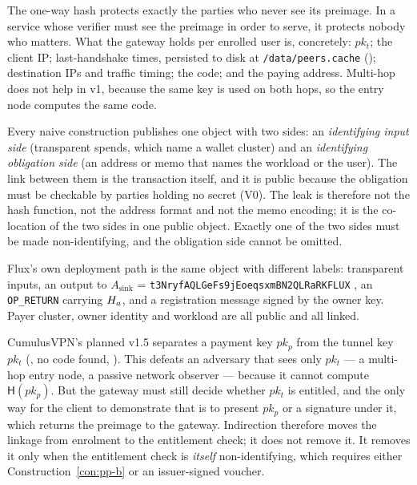 The one-way hash protects exactly the parties who never see its preimage. In a service whose verifier
must see the preimage in order to serve, it protects nobody who matters. What the gateway holds per
enrolled user is, concretely: $pk_t$; the client IP; last-handshake times, persisted to disk at
\texttt{/\allowbreak{}data/\allowbreak{}peers.\allowbreak{}cache} ();
destination IPs and traffic timing; the code; and the paying address. Multi-hop does not help in v1,
because the same key is used on both hops, so the entry node computes the same code.

\begin{property}
\label{prop:pp-general}
Every naive construction publishes one object with two sides: an \emph{identifying input side}
(transparent spends, which name a wallet cluster) and an \emph{identifying obligation side} (an
address or memo that names the workload or the user). The link between them is the transaction itself,
and it is public because the obligation must be checkable by parties holding no secret (V0). The leak
is therefore not the hash function, not the address format and not the memo encoding; it is the
co-location of the two sides in one public object. Exactly one of the two sides must be made
non-identifying, and the obligation side cannot be omitted.
\end{property}

Flux's own deployment path is the same object with different labels: transparent inputs, an output to
$A_{\mathrm{sink}}$ = \texttt{t3Nryf\allowbreak{}AQLGe\allowbreak{}Fs9j\allowbreak{}Eoeqsxm\allowbreak{}BN2QLRa\allowbreak{}RKFLUX}
, an \texttt{OP\_RETURN} carrying
$H_{a}$, and a registration message signed by the owner key. Payer cluster, owner identity and
workload are all public and all linked.

\begin{property}
\label{prop:pp-v15}
CumulusVPN's planned v1.5 separates a payment key $pk_p$ from the tunnel key $pk_t$
(\planned, no code found, ). This defeats an adversary
that sees only $pk_t$ --- a multi-hop entry node, a passive network observer --- because it cannot
compute $\mathsf{H}(pk_p)$. But the gateway must still decide whether $pk_t$ is entitled, and the only
way for the client to demonstrate that is to present $pk_p$ or a signature under it, which returns the
preimage to the gateway. Indirection therefore moves the linkage from enrolment to the entitlement
check; it does not remove it. It removes it only when the entitlement check is \emph{itself}
non-identifying, which requires either Construction~\ref{con:pp-b} or an issuer-signed voucher.
\end{property}

